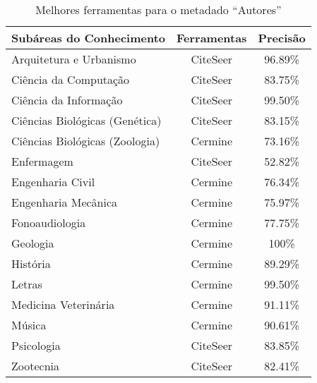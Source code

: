 \begin{table}[h!]
    \caption{Melhores ferramentas para o metadado ``Autores''}
    \begin{center}
        \begin{tabular}{|l|c|c|}
            \hline 
            \textbf{Subáreas do Conhecimento} & \textbf{Ferramentas} & \textbf{Precisão} \\ 
            \hline 
            Arquitetura e Urbanismo & CiteSeer & 96.89\% \\ \hline
            Ciência da Computação & CiteSeer & 83.75\% \\ \hline
            Ciência da Informação & CiteSeer & 99.50\% \\ \hline
            Ciências Biológicas (Genética) & CiteSeer & 83.15\% \\ \hline
            Ciências Biológicas (Zoologia) & Cermine & 73.16\% \\ \hline
            Enfermagem & CiteSeer & 52.82\% \\ \hline
            Engenharia Civil & Cermine & 76.34\% \\ \hline
            Engenharia Mecânica & Cermine & 75.97\% \\ \hline
            Fonoaudiologia & Cermine & 77.75\% \\ \hline
            Geologia & Cermine & 100\% \\ \hline
            História & Cermine & 89.29\% \\ \hline
            Letras & Cermine & 99.50\% \\ \hline
            Medicina Veterinária & Cermine & 91.11\% \\ \hline
            Música & Cermine & 90.61\% \\ \hline
            Psicologia & CiteSeer & 83.85\% \\ \hline
            Zootecnia & CiteSeer & 82.41\% \\ \hline
        \end{tabular}
    \end{center}
    \label{tab:areas-authors-tools}
\end{table}

